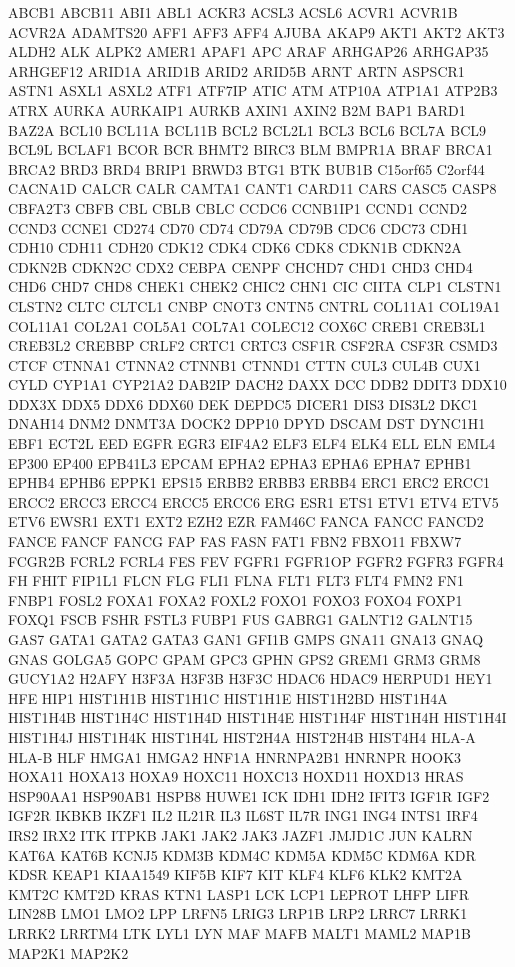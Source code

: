 \documentclass[8pt,letterpaper]{extarticle}
\begin{document}
{\tiny
ABCB1 ABCB11 ABI1 ABL1 ACKR3 ACSL3 ACSL6 ACVR1 ACVR1B ACVR2A ADAMTS20 AFF1 AFF3 AFF4 AJUBA AKAP9 AKT1 AKT2 AKT3 ALDH2 ALK ALPK2 AMER1 APAF1 APC ARAF ARHGAP26 ARHGAP35 ARHGEF12 ARID1A ARID1B ARID2 ARID5B ARNT ARTN ASPSCR1 ASTN1 ASXL1 ASXL2 ATF1 ATF7IP ATIC ATM ATP10A ATP1A1 ATP2B3 ATRX AURKA AURKAIP1 AURKB
AXIN1 AXIN2 B2M BAP1 BARD1 BAZ2A BCL10 BCL11A BCL11B BCL2 BCL2L1 BCL3 BCL6 BCL7A BCL9 BCL9L BCLAF1 BCOR BCR BHMT2 BIRC3 BLM BMPR1A BRAF BRCA1 BRCA2 BRD3 BRD4 BRIP1 BRWD3 BTG1 BTK BUB1B C15orf65 C2orf44 CACNA1D CALCR CALR CAMTA1 CANT1 CARD11 CARS CASC5 CASP8 CBFA2T3 CBFB CBL CBLB CBLC CCDC6 CCNB1IP1
CCND1 CCND2 CCND3 CCNE1 CD274 CD70 CD74 CD79A CD79B CDC6 CDC73 CDH1 CDH10 CDH11 CDH20 CDK12 CDK4 CDK6 CDK8 CDKN1B CDKN2A CDKN2B CDKN2C CDX2 CEBPA CENPF CHCHD7 CHD1 CHD3 CHD4 CHD6 CHD7 CHD8 CHEK1 CHEK2 CHIC2 CHN1 CIC CIITA CLP1 CLSTN1 CLSTN2 CLTC CLTCL1 CNBP CNOT3 CNTN5 CNTRL COL11A1 COL19A1 COL11A1
COL2A1 COL5A1 COL7A1 COLEC12 COX6C CREB1 CREB3L1 CREB3L2 CREBBP CRLF2 CRTC1 CRTC3 CSF1R CSF2RA CSF3R CSMD3 CTCF CTNNA1 CTNNA2 CTNNB1 CTNND1 CTTN CUL3 CUL4B CUX1 CYLD CYP1A1 CYP21A2 DAB2IP DACH2 DAXX DCC DDB2 DDIT3 DDX10 DDX3X DDX5 DDX6 DDX60 DEK DEPDC5 DICER1 DIS3 DIS3L2 DKC1 DNAH14 DNM2 DNMT3A DOCK2 DPP10 DPYD
DSCAM DST DYNC1H1 EBF1 ECT2L EED EGFR EGR3 EIF4A2 ELF3 ELF4 ELK4 ELL ELN EML4 EP300 EP400 EPB41L3 EPCAM EPHA2 EPHA3 EPHA6 EPHA7 EPHB1 EPHB4 EPHB6 EPPK1 EPS15 ERBB2 ERBB3 ERBB4 ERC1 ERC2 ERCC1 ERCC2 ERCC3 ERCC4 ERCC5 ERCC6 ERG ESR1 ETS1 ETV1 ETV4 ETV5 ETV6 EWSR1 EXT1 EXT2 EZH2 EZR
FAM46C FANCA FANCC FANCD2 FANCE FANCF FANCG FAP FAS FASN FAT1 FBN2 FBXO11 FBXW7 FCGR2B FCRL2 FCRL4 FES FEV FGFR1 FGFR1OP FGFR2 FGFR3 FGFR4 FH FHIT FIP1L1 FLCN FLG FLI1 FLNA FLT1 FLT3 FLT4 FMN2 FN1 FNBP1 FOSL2 FOXA1 FOXA2 FOXL2 FOXO1 FOXO3 FOXO4 FOXP1 FOXQ1 FSCB FSHR FSTL3 FUBP1 FUS
GABRG1 GALNT12 GALNT15 GAS7 GATA1 GATA2 GATA3 GAN1 GFI1B GMPS GNA11 GNA13 GNAQ GNAS GOLGA5 GOPC GPAM GPC3 GPHN GPS2 GREM1 GRM3 GRM8 GUCY1A2 H2AFY H3F3A H3F3B H3F3C HDAC6 HDAC9 HERPUD1 HEY1 HFE HIP1 HIST1H1B HIST1H1C HIST1H1E HIST1H2BD HIST1H4A HIST1H4B HIST1H4C HIST1H4D HIST1H4E HIST1H4F HIST1H4H HIST1H4I HIST1H4J HIST1H4K HIST1H4L HIST2H4A HIST2H4B
HIST4H4 HLA-A HLA-B HLF HMGA1 HMGA2 HNF1A HNRNPA2B1 HNRNPR HOOK3 HOXA11 HOXA13 HOXA9 HOXC11 HOXC13 HOXD11 HOXD13 HRAS HSP90AA1 HSP90AB1 HSPB8 HUWE1 ICK IDH1 IDH2 IFIT3 IGF1R IGF2 IGF2R IKBKB IKZF1 IL2 IL21R IL3 IL6ST IL7R ING1 ING4 INTS1 IRF4 IRS2 IRX2 ITK ITPKB JAK1 JAK2 JAK3 JAZF1 JMJD1C JUN KALRN
KAT6A KAT6B KCNJ5 KDM3B KDM4C KDM5A KDM5C KDM6A KDR KDSR KEAP1 KIAA1549 KIF5B KIF7 KIT KLF4 KLF6 KLK2 KMT2A KMT2C KMT2D KRAS KTN1 LASP1 LCK LCP1 LEPROT LHFP LIFR LIN28B LMO1 LMO2 LPP LRFN5 LRIG3 LRP1B LRP2 LRRC7 LRRK1 LRRK2 LRRTM4 LTK LYL1 LYN MAF MAFB MALT1 MAML2 MAP1B MAP2K1 MAP2K2
}
\end{document}
